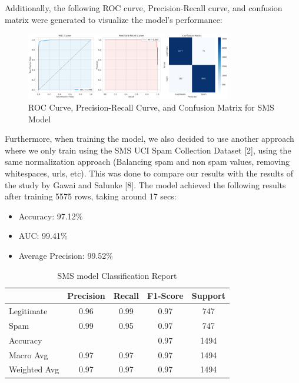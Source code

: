 \documentclass{article}
\begin{document}
\noindent
Additionally, the following ROC curve, Precision-Recall curve, and confusion matrix were generated to visualize the model's performance:
\begin{figure}[htbp]
    \centering
    \includegraphics[width=0.8\textwidth]{../analysis/sms/sms_model_performance.png}
    \caption{ROC Curve, Precision-Recall Curve, and Confusion Matrix for SMS Model}
    \label{fig:roc_curve_2}
\end{figure}

\noindent
Furthermore, when training the model, we also decided to use another approach where we only train using the SMS UCI Spam Collection Dataset [2], using the same normalization approach (Balancing spam and non spam values, removing whitespaces, urls, etc). This was done to compare our results with the results of the study by Gawai and Salunke [8]. The model achieved the following results after training 5575 rows, taking around 17 secs: 
\begin{itemize}
    \item Accuracy: 97.12\%
    \item AUC: 99.41\%
    \item Average Precision: 99.52\%
\end{itemize}

\begin{table}[htbp]
    \centering
    \caption{SMS model Classification Report}
    \begin{tabular}{l c c c c}
    \toprule
     & Precision & Recall & F1-Score & Support \\
    \midrule
    Legitimate & 0.96 & 0.99 & 0.97 & 747 \\
    Spam & 0.99 & 0.95 & 0.97 & 747 \\
    \midrule
    Accuracy & & & 0.97 & 1494 \\
    Macro Avg & 0.97 & 0.97 & 0.97 & 1494 \\
    Weighted Avg & 0.97 & 0.97 & 0.97 & 1494 \\
    \bottomrule
    \end{tabular}
    \label{tab:classification_report_3}
\end{table}
\end{document}
